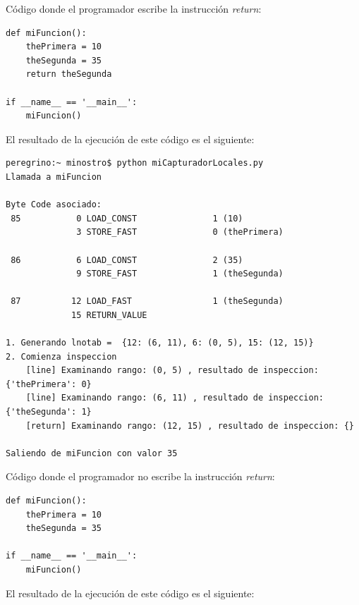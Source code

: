 \documentclass[12pt,legalpaper]{report}
\begin{document}
Código donde el programador escribe la instrucción \textit{return}:

\begin{singlespace}
\begin{lstlisting}[style=Python]
def miFuncion():
    thePrimera = 10
    theSegunda = 35
    return theSegunda

if __name__ == '__main__':
    miFuncion()
\end{lstlisting}
\end{singlespace}

El resultado de la ejecución de este código es el siguiente:

\begin{singlespace}
\begin{lstlisting}[style=consola,numbers=none]
peregrino:~ minostro$ python miCapturadorLocales.py
Llamada a miFuncion

Byte Code asociado:
 85           0 LOAD_CONST               1 (10)
              3 STORE_FAST               0 (thePrimera)

 86           6 LOAD_CONST               2 (35)
              9 STORE_FAST               1 (theSegunda)

 87          12 LOAD_FAST                1 (theSegunda)
             15 RETURN_VALUE        

1. Generando lnotab =  {12: (6, 11), 6: (0, 5), 15: (12, 15)}
2. Comienza inspeccion
    [line] Examinando rango: (0, 5) , resultado de inspeccion: {'thePrimera': 0}
    [line] Examinando rango: (6, 11) , resultado de inspeccion: {'theSegunda': 1}
    [return] Examinando rango: (12, 15) , resultado de inspeccion: {}
    
Saliendo de miFuncion con valor 35
\end{lstlisting}
\end{singlespace}

Código donde el programador no escribe la instrucción \textit{return}:

\begin{singlespace}
\begin{lstlisting}[style=Python]
def miFuncion():
    thePrimera = 10
    theSegunda = 35

if __name__ == '__main__':
    miFuncion()
\end{lstlisting}
\end{singlespace}

El resultado de la ejecución de este código es el siguiente:
\end{document}

